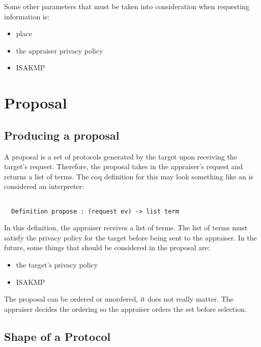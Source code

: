 \documentclass[10pt]{report}
\newcommand{\squash}{\itemsep=0pt\parskip=0pt}
\begin{document}
  
  Some other parameters that must be taken into consideration when
  requesting information is: 
  
  \begin{itemize}
   \squash
   \item place
   \item the appraiser privacy policy
   \item ISAKMP
   \end{itemize}

\section{Proposal}

\subsection{Producing a proposal}

A proposal is a set of protocols generated by the target upon receiving
the target's request. Therefore, the proposal takes in the appraiser's
request and returns a list of terms. The coq definition for this may
look something like an is considered an interpreter: 
  
\begin{verbatim}
  
  Definition propose : (request ev) -> list term

\end{verbatim}  
  
  In this definition, the appraiser receives a list of terms. The list
  of terms must satisfy the privacy policy for the target before being
  sent to the appraiser. In the future, some things that should be
  considered in the proposal are:
  
  \begin{itemize}
   \squash
   \item the target's privacy policy
   \item ISAKMP
  \end{itemize}
  
  The proposal can be ordered or unordered, it does not really
  matter. The appraiser decides the ordering so the appraiser orders
  the set before selection.

\subsection{Shape of a Protocol}
\end{document}
